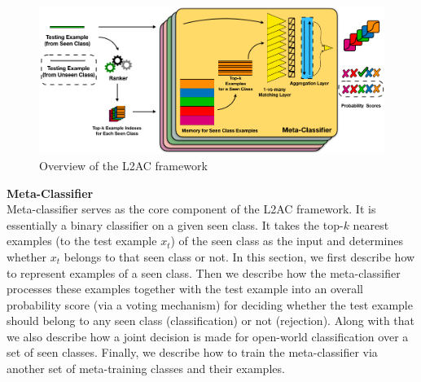 \begin{figure}
\centering    
\includegraphics[width=5.5in]{fig/www19_overview.png}
\caption{Overview of the L2AC framework}
\label{chap2:fig:overview}
\end{figure}

\textbf{Meta-Classifier}\\
Meta-classifier serves as the core component of the L2AC framework. It is essentially a binary classifier on a given seen class. It takes the top-$k$ nearest examples (to the test example $x_t$) of the seen class as the input and determines whether $x_t$ belongs to that seen class or not.
In this section, we first describe how to represent examples of a seen class. Then we describe how the meta-classifier processes these examples together with the test example into an overall probability score (via a voting mechanism) for deciding whether the test example should belong to any seen class (classification) or not (rejection). Along with that we also describe how a joint decision is made for open-world classification over a set of seen classes. Finally, we describe how to train the meta-classifier via another set of meta-training classes and their examples.

